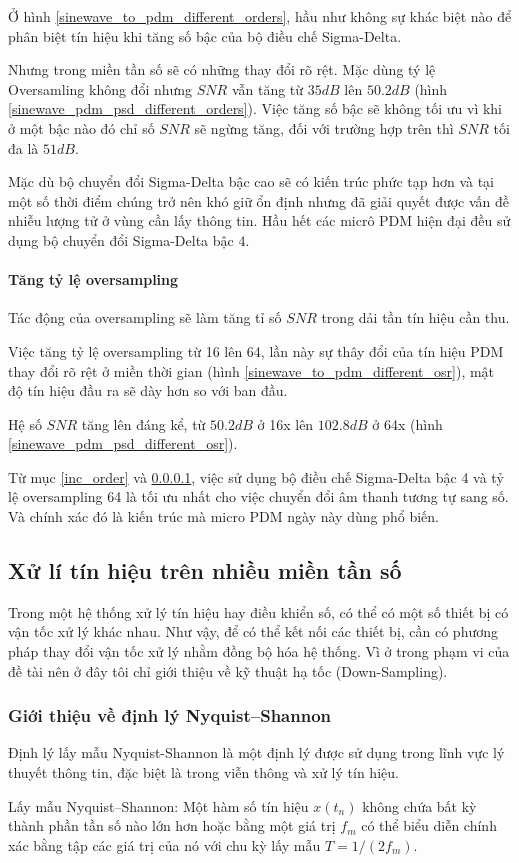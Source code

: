 Ở hình \ref{sinewave_to_pdm_different_orders}, hầu như không sự khác biệt nào để phân biệt tín hiệu khi tăng số bậc của bộ điều chế Sigma-Delta. 

Nhưng trong miền tần số sẽ có những thay đổi rõ rệt. Mặc dùng tý lệ Oversamling không đổi nhưng $SNR$ vẫn tăng từ $35dB$ lên $50.2dB$ (hình \ref{sinewave_pdm_psd_different_orders}).  Việc tăng số bậc sẽ không tối ưu vì khi ở một bậc nào đó chỉ số $SNR$ sẽ ngừng tăng, đối với trường hợp trên thì $SNR$ tối đa là $51dB$.

Mặc dù bộ chuyển đổi Sigma-Delta bậc cao sẽ có kiến trúc phức tạp hơn và tại một số thời điểm chúng trở nên khó giữ ổn định nhưng đã giải quyết được vấn đề nhiễu lượng tử ở vùng cần lấy thông tin. Hầu hết các micrô PDM hiện đại đều sử dụng bộ chuyển đổi Sigma-Delta bậc 4.


\paragraph{Tăng tỷ lệ oversampling} \label{inc_sam}
Tác động của oversampling sẽ làm tăng tỉ số $SNR$ trong dải tần tín hiệu cần thu.

Việc tăng tỷ lệ oversampling từ 16 lên 64, lần này sự thây đổi của tín hiệu PDM thay đổi rõ rệt ở miền thời gian (hình \ref{sinewave_to_pdm_different_osr}), mật độ tín hiệu đầu ra sẽ dày hơn so với ban đầu.

Hệ số $SNR$ tăng lên đáng kể, từ $50.2dB$ ở 16x lên $102.8dB$ ở 64x (hình \ref{sinewave_pdm_psd_different_osr}).

Từ mục \ref{inc_order} và \ref{inc_sam}, việc sử dụng bộ điều chế Sigma-Delta bậc 4 và tỷ lệ oversampling 64 là tối ưu nhất cho việc chuyển đổi âm thanh tương tự sang số. Và chính xác đó là kiến trúc mà micro PDM ngày này dùng phổ biến.

\subsection{Xử lí tín hiệu trên nhiều miền tần số}\label{xulynhieumientanso}
Trong một hệ thống xử lý tín hiệu hay điều khiển số, có thể có
một số thiết bị có vận tốc xử lý khác nhau. Như vậy, để có thể kết nối
các thiết bị, cần có phương pháp thay đổi vận tốc xử lý nhằm đồng
bộ hóa hệ thống. Vì ở trong phạm vi của đề tài nên ở đây tôi chỉ giới thiệu về kỹ thuật hạ tốc (Down-Sampling).
\subsubsection{Giới thiệu về định lý Nyquist–Shannon}
Định lý lấy mẫu Nyquist-Shannon là một định lý được sử dụng trong lĩnh vực lý thuyết thông tin, đặc biệt là trong viễn thông và xử lý tín hiệu.
\begin{theorem}\label{dlnq} %
 Lấy mẫu Nyquist–Shannon: Một hàm số tín hiệu $x(t_n)$ không chứa bất kỳ thành phần tần số nào lớn hơn hoặc bằng một giá trị $f_m$ có thể biểu diễn chính xác bằng tập các giá trị của nó với chu kỳ lấy mẫu $T=1/(2f_m)$.
\end{theorem}

